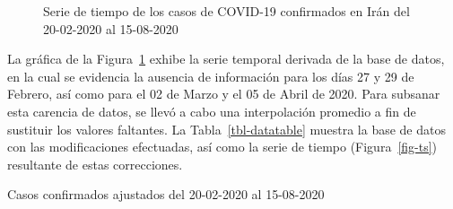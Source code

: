 \documentclass[
  letterpaper,
  DIV=11,
  numbers=noendperiod]{scrreport}
\theoremstyle{plain}
\theoremstyle{definition}
\theoremstyle{definition}
\theoremstyle{plain}
\theoremstyle{remark}
\begin{document}
\begin{figure}


\caption{\label{fig-ori}Serie de tiempo de los casos de COVID-19
confirmados en Irán del 20-02-2020 al 15-08-2020}

\end{figure}%

La gráfica de la Figura~\ref{fig-ori} exhibe la serie temporal derivada
de la base de datos, en la cual se evidencia la ausencia de información
para los días 27 y 29 de Febrero, así como para el 02 de Marzo y el 05
de Abril de 2020. Para subsanar esta carencia de datos, se llevó a cabo
una interpolación promedio a fin de sustituir los valores faltantes. La
Tabla~\ref{tbl-datatable} muestra la base de datos con las
modificaciones efectuadas, así como la serie de tiempo
(Figura~\ref{fig-ts}) resultante de estas correcciones.

\begin{table}

\caption{\label{tbl-datatable}Casos confirmados ajustados del 20-02-2020
al 15-08-2020}


\end{table}%
\end{document}
